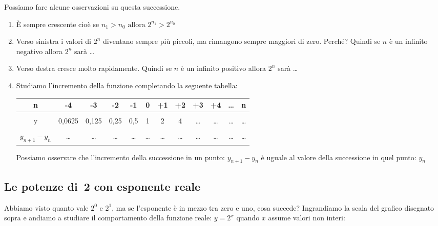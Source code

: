 \begin{osservazione}
Possiamo fare alcune osservazioni su questa successione.

\begin{enumerate}
 \item 
  È sempre crescente cioè se \(n_1 > n_0 \text{ allora } 2^{n_1} > 2^{n_0}\)
 \item 
  Verso sinistra i valori di \(2^n\) diventano sempre più piccoli, ma rimangono 
  sempre maggiori di zero. Perché? Quindi se \(n\) è un infinito negativo 
  allora \(2^n\) sarà \dots
 \item 
  Verso destra cresce molto rapidamente. Quindi se \(n\) è un infinito positivo 
  allora \(2^n\) sarà \dots
 \item 
  Studiamo l'incremento della funzione completando la seguente tabella:
  
\begin{center}
\begin{tabular}{cccccccccccc}
n & -4    & -3    & -2   & -1  & 0 & +1 & +2 & +3    & +4    & \dots & n\\
\hline \\
y & 0,0625 & 0,125 & 0,25 & 0,5 & 1 & 2  & 4  & \dots & \dots & \dots & \dots\\
\hline \\
\(y_{n+1} - y_n\) & 
    \dots & \dots & \dots & \dots & \dots & \dots  & \dots  & \dots & \dots & 
\dots & \dots\\
\end{tabular}
\end{center}

  Possiamo osservare che l'incremento della successione in un punto: 
  \(y_{n+1} - y_n\) 
  è uguale al valore della successione in quel punto: 
  \(y_n\) 

\end{enumerate}
\end{osservazione}

\subsection{Le potenze di~2 con esponente reale}
\label{subsec:esplog_potdue}

Abbiamo visto quanto vale \(2^0\) e \(2^1\), ma se l'esponente è in mezzo 
tra zero e uno, cosa succede? Ingrandiamo la scala del grafico disegnato sopra 
e andiamo a studiare il comportamento della funzione reale: \(y=2^x\) quando 
\(x\) assume valori non interi:

